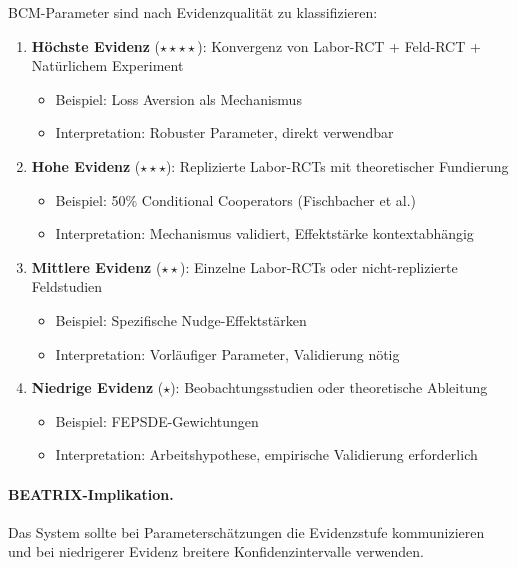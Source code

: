\begin{axiom}
BCM-Parameter sind nach Evidenzqualität zu klassifizieren:

\begin{enumerate}
    \item \textbf{Höchste Evidenz} ($\star\star\star\star$): Konvergenz von Labor-RCT + Feld-RCT + Natürlichem Experiment
    \begin{itemize}
        \item Beispiel: Loss Aversion als Mechanismus
        \item Interpretation: Robuster Parameter, direkt verwendbar
    \end{itemize}

    \item \textbf{Hohe Evidenz} ($\star\star\star$): Replizierte Labor-RCTs mit theoretischer Fundierung
    \begin{itemize}
        \item Beispiel: 50\% Conditional Cooperators (Fischbacher et al.)
        \item Interpretation: Mechanismus validiert, Effektstärke kontextabhängig
    \end{itemize}

    \item \textbf{Mittlere Evidenz} ($\star\star$): Einzelne Labor-RCTs oder nicht-replizierte Feldstudien
    \begin{itemize}
        \item Beispiel: Spezifische Nudge-Effektstärken
        \item Interpretation: Vorläufiger Parameter, Validierung nötig
    \end{itemize}

    \item \textbf{Niedrige Evidenz} ($\star$): Beobachtungsstudien oder theoretische Ableitung
    \begin{itemize}
        \item Beispiel: FEPSDE-Gewichtungen
        \item Interpretation: Arbeitshypothese, empirische Validierung erforderlich
    \end{itemize}
\end{enumerate}

\paragraph{BEATRIX-Implikation.}
Das System sollte bei Parameterschätzungen die Evidenzstufe kommunizieren und bei niedrigerer Evidenz breitere Konfidenzintervalle verwenden.
\end{axiom}

